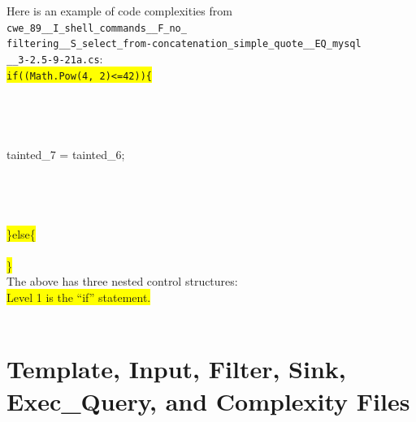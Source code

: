 \documentclass[12pt]{article}
\begin{document}
Here is an example of code complexities from \verb|cwe_89__I_shell_commands__F_no_|\\
\verb|filtering__S_select_from-concatenation_simple_quote__EQ_mysql| \\
\verb|__3-2.5-9-21a.cs|: \\
{\texttt
{\colorbox{yellow}{if((Math.Pow(4, 2)<=42))\{}}\\
\\
\\
\\
\\
\hspace*{6em}tainted\_7 = tainted\_6;\\
\\
\\
\\              
\\
{\colorbox{yellow}{\}else\{}}\\
\\
{\colorbox{yellow}{\}}}
}
\\
The above has three nested control structures:\\
{\colorbox{yellow}{Level 1 is the ``if'' statement.}}\\
\\


\section{Template, Input, Filter, Sink, Exec\_Query, and Complexity Files}
\label{sec:source files}
\end{document}
